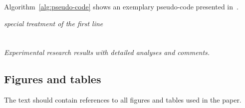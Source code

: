 \documentclass[english]{projectreport}
\begin{document}
Algorithm~\ref{alg:pseudo-code} shows an exemplary pseudo-code presented in~\cite{fiorio2017algorithm2e}.

\begin{algorithm}[!htbp]
\BlankLine
\emph{special treatment of the first line}\;
  \caption[Exemplary algorithm]{Exemplary algorithm (source: \cite{fiorio2017algorithm2e}).}
  \label{alg:pseudo-code}
\end{algorithm}

\section{\SectionTitleExperiments}
\label{sec:experiments}


\emph{Experimental research results with detailed analyses and comments.}

\subsection{Figures and tables}
\label{sec:figures-tables}

The text should contain references to all figures and tables used in the paper.

\end{document}
